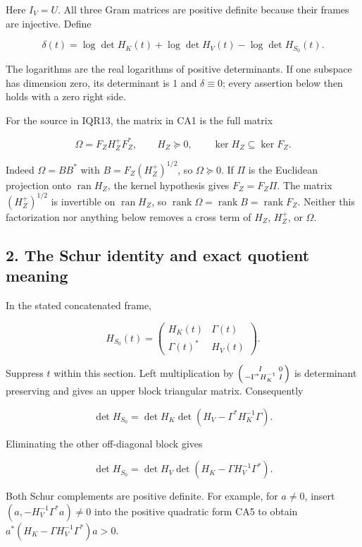 \documentclass[11pt]{article}
\begin{document}
Here \(I_V=U\). All three Gram matrices are positive definite because their frames are injective. Define

\[
\delta(t)=\log\det H_K(t)+\log\det H_V(t)
-\log\det H_{S_0}(t).
\tag{CA3}
\]

The logarithms are the real logarithms of positive determinants. If one subspace has dimension zero, its determinant is 1 and \(\delta\equiv0\); every assertion below then holds with a zero right side.

For the source in IQR13, the matrix in CA1 is the full matrix

\[
\Omega=F_ZH_Z^+F_Z^*,
\qquad H_Z\succeq0,
\qquad \ker H_Z\subseteq\ker F_Z.
\tag{CA4}
\]

Indeed \(\Omega=BB^*\) with \(B=F_Z(H_Z^+)^{1/2}\), so \(\Omega\succeq0\). If \(\Pi\) is the Euclidean projection onto \(\operatorname{ran}H_Z\), the kernel hypothesis gives \(F_Z=F_Z\Pi\). The matrix \((H_Z^+)^{1/2}\) is invertible on \(\operatorname{ran}H_Z\), so \(\operatorname{rank}\Omega=\operatorname{rank}B=\operatorname{rank}F_Z\). Neither this factorization nor anything below removes a cross term of \(H_Z\), \(H_Z^+\), or \(\Omega\).

\subsection{2. The Schur identity and exact quotient meaning}\label{the-schur-identity-and-exact-quotient-meaning}

In the stated concatenated frame,

\[
H_{S_0}(t)=
\begin{pmatrix}H_K(t)&\Gamma(t)\\
\Gamma(t)^*&H_V(t)\end{pmatrix}.
\tag{CA5}
\]

Suppress \(t\) within this section. Left multiplication by \(\begin{psmallmatrix}I&0\\-\Gamma^*H_K^{-1}&I\end{psmallmatrix}\) is determinant preserving and gives an upper block triangular matrix. Consequently

\[
\det H_{S_0}
=\det H_K\det(H_V-\Gamma^*H_K^{-1}\Gamma).
\tag{CA6}
\]

Eliminating the other off-diagonal block gives

\[
\det H_{S_0}
=\det H_V\det(H_K-\Gamma H_V^{-1}\Gamma^*).
\tag{CA7}
\]

Both Schur complements are positive definite. For example, for \(a\ne0\), insert \((a,-H_V^{-1}\Gamma^*a)\ne0\) into the positive quadratic form CA5 to obtain \(a^*(H_K-\Gamma H_V^{-1}\Gamma^*)a>0\).
\end{document}
